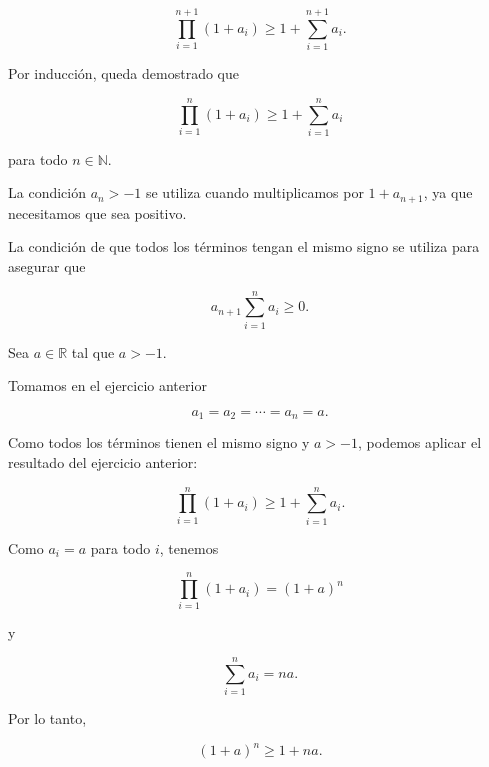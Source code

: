 \begin{ejercicio}
\[
\prod_{i=1}^{n+1}(1+a_i)
\geq
1+\sum_{i=1}^{n+1}a_i.
\]

Por inducción, queda demostrado que

\[
\boxed{
\prod_{i=1}^{n}(1+a_i)
\geq
1+\sum_{i=1}^{n}a_i
}
\]

para todo $n \in \mathbb{N}$.

La condición $a_n>-1$ se utiliza cuando multiplicamos por
$1+a_{n+1}$, ya que necesitamos que sea positivo.

La condición de que todos los términos tengan el mismo signo se utiliza
para asegurar que

\[
a_{n+1}\sum_{i=1}^{n}a_i\geq0.
\]
\end{ejercicio}

\begin{ejercicio}
Sea $a\in\mathbb{R}$ tal que $a>-1$.

Tomamos en el ejercicio anterior

\[
a_1=a_2=\cdots=a_n=a.
\]

Como todos los términos tienen el mismo signo y $a>-1$, podemos aplicar
el resultado del ejercicio anterior:

\[
\prod_{i=1}^{n}(1+a_i)
\geq
1+\sum_{i=1}^{n}a_i.
\]

Como $a_i=a$ para todo $i$, tenemos

\[
\prod_{i=1}^{n}(1+a_i)=(1+a)^n
\]

y

\[
\sum_{i=1}^{n}a_i=na.
\]

Por lo tanto,

\[
\boxed{(1+a)^n\geq1+na}.
\]
\end{ejercicio}
